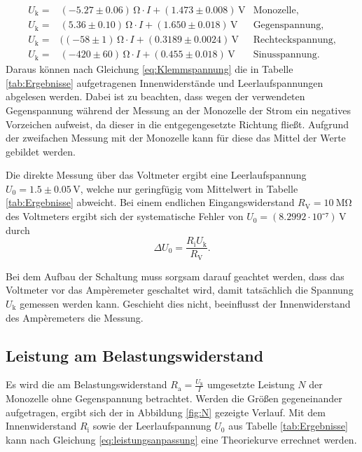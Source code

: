 \begin{align}
U_\mathup{k}=&(-5.27\pm0.06)\,\si{\ohm}\cdot I+(1.473\pm0.008)\,\si{\volt} &\text{Monozelle},\\
U_\mathup{k}=&(5.36\pm0.10)\,\si{\ohm}\cdot I+(1.650\pm0.018)\,\si{\volt} &\text{Gegenspannung},\\
U_\mathup{k}=&((-58\pm1)\,\si{\ohm}\cdot I+(0.3189\pm0.0024)\,\si{\volt} &\text{Rechteckspannung},\\
U_ \mathup{k}=&(-420\pm60)\,\si{\ohm}\cdot I +(0.455\pm0.018)\,\si{\volt} &\text{Sinusspannung}.
\end{align}
Daraus können nach Gleichung \eqref{eq:Klemmspannung} die in Tabelle \ref{tab:Ergebnisse} aufgetragenen Innenwiderstände und Leerlaufspannungen abgelesen werden. Dabei ist zu beachten, dass wegen der verwendeten Gegenspannung während der Messung an der Monozelle der Strom ein negatives Vorzeichen aufweist, da dieser in die entgegengesetzte Richtung fließt. Aufgrund der zweifachen Messung mit der Monozelle kann für diese das Mittel der Werte gebildet werden. 

\newpage
Die direkte Messung über das Voltmeter ergibt eine Leerlaufspannung $U_0=1.5\pm0.05\,\si{\volt}$, welche nur geringfügig vom Mittelwert in Tabelle \ref{tab:Ergebnisse} abweicht. Bei einem endlichen Eingangswiderstand $R_\mathup{V}=\SI{10}{\mega\ohm}$ des Voltmeters ergibt sich der systematische Fehler von $U_0=(8.2992\cdot10⁻⁷)\,\si{\volt}$ durch
\begin{equation}
\Delta{U_0}=\frac{R_\mathup{i}U_\mathup{k}}{R_\mathup{V}}.
\end{equation}

Bei dem Aufbau der Schaltung muss sorgsam darauf geachtet werden, dass das Voltmeter vor das Ampèremeter geschaltet wird, damit tatsächlich die Spannung $U_\mathup{k}$ gemessen werden kann. Geschieht dies nicht, beeinflusst der Innenwiderstand des Ampèremeters die Messung.
\newpage
\subsection{Leistung am Belastungswiderstand}

Es wird die am Belastungswiderstand $R_\mathup{a}=\frac{U_\mathup{k}}{I}$ umgesetzte Leistung $N$ der Monozelle ohne Gegenspannung betrachtet.
Werden die Größen gegeneinander aufgetragen, ergibt sich der in Abbildung \ref{fig:N} gezeigte Verlauf. Mit dem Innenwiderstand $R_\mathup{i}$ sowie der Leerlaufspannung $U_0$ aus Tabelle \ref{tab:Ergebnisse} kann nach Gleichung \eqref{eq:leistungsanpassung} eine Theoriekurve errechnet werden.

